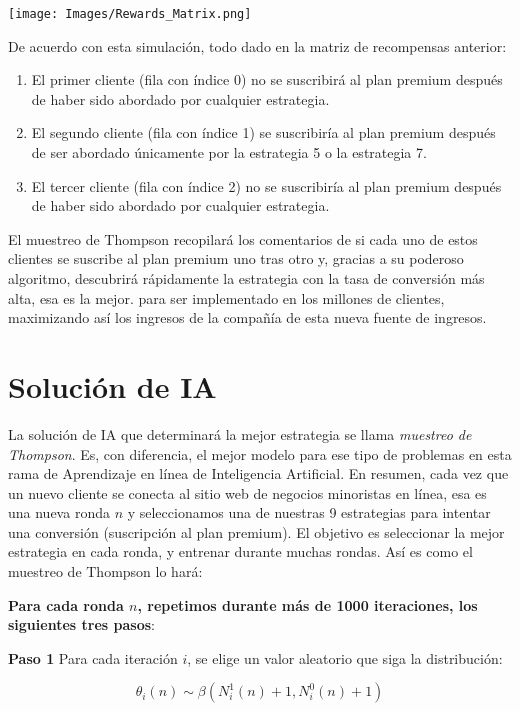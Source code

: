 \documentclass[
]{book}
\providecommand{\tightlist}{%
  \setlength{\itemsep}{0pt}\setlength{\parskip}{0pt}}
\begin{document}
\texttt{[image: Images/Rewards\_Matrix.png]}

De acuerdo con esta simulación, todo dado en la matriz de recompensas anterior:

\begin{enumerate}
\def\labelenumi{\arabic{enumi}.}
\tightlist
\item
  El primer cliente (fila con índice 0) no se suscribirá al plan premium después de haber sido abordado por cualquier estrategia.
\item
  El segundo cliente (fila con índice 1) se suscribiría al plan premium después de ser abordado únicamente por la estrategia 5 o la estrategia 7.
\item
  El tercer cliente (fila con índice 2) no se suscribiría al plan premium después de haber sido abordado por cualquier estrategia.
\end{enumerate}

El muestreo de Thompson recopilará los comentarios de si cada uno de estos clientes se suscribe al plan premium uno tras otro y, gracias a su poderoso algoritmo, descubrirá rápidamente la estrategia con la tasa de conversión más alta, esa es la mejor. para ser implementado en los millones de clientes, maximizando así los ingresos de la compañía de esta nueva fuente de ingresos.

\hypertarget{soluciuxf3n-de-ia-1}{%
\section{Solución de IA}\label{soluciuxf3n-de-ia-1}}

La solución de IA que determinará la mejor estrategia se llama \emph{muestreo de Thompson}. Es, con diferencia, el mejor modelo para ese tipo de problemas en esta rama de Aprendizaje en línea de Inteligencia Artificial. En resumen, cada vez que un nuevo cliente se conecta al sitio web de negocios minoristas en línea, esa es una nueva ronda \(n\) y seleccionamos una de nuestras 9 estrategias para intentar una conversión (suscripción al plan premium). El objetivo es seleccionar la mejor estrategia en cada ronda, y entrenar durante muchas rondas. Así es como el muestreo de Thompson lo hará:

\textbf{Para cada ronda \(n\), repetimos durante más de 1000 iteraciones, los siguientes tres pasos}:

\textbf{Paso 1} Para cada iteración \(i\), se elige un valor aleatorio que siga la distribución:

\[\theta_i(n) \sim \beta(N_i^1(n)+1,N_i^0(n)+1)\]
\end{document}
